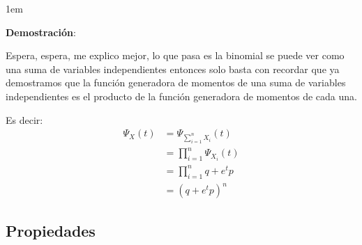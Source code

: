 \documentclass[12pt, fleqn]{report}                             %
\newenvironment{SmallIndentation}[1][0.75em]                    %
        {\begin{adjustwidth}{#1}{}\begin{footnotesize}}             %
        {\end{footnotesize}\end{adjustwidth}}                       %
\theoremstyle{break}                                            %
\newcommand{\Wrap}[1]           {\left( #1 \right)}             %
\begin{document}
                \begin{SmallIndentation}[1em]
                    \textbf{Demostración}:
                    
                    Espera, espera, me explico mejor, lo que pasa es la binomial se puede ver
                    como una suma de variables independientes entonces solo basta con recordar
                    que ya demostramos que la función generadora de momentos de una suma
                    de variables independientes es el producto de la función generadora
                    de momentos de cada una.

                    Es decir:
                    \begin{align*}
                        \Psi_X (t) 
                            &= \Psi_{\sum_{i=1}^n X_i} (t)      \\
                            &= \prod_{i = 1}^n \Psi_{X_i} (t)   \\
                            &= \prod_{i = 1}^n q + e^t p        \\
                            &= \Wrap{q + e^tp}^n                  
                    \end{align*} 

                \end{SmallIndentation}
                    
            
                    
                    
            \clearpage
            \subsection{Propiedades}
\end{document}
